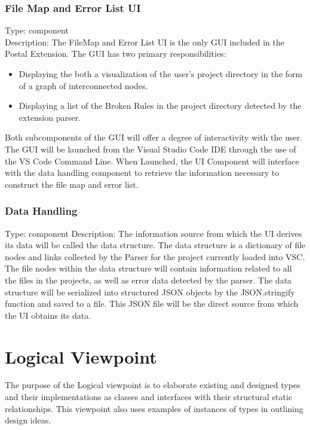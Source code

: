 \documentclass[letterpaper,10pt,titlepage,draftclsnofoot,onecolumn,onesided] {IEEEtran}
\begin{document}
		
	
	\subsubsection{File Map and Error List UI}
	Type: component
	\\
	Description: The FileMap and Error List UI is the only GUI included in the Postal Extension. 
	The GUI has two primary responsibilities: 
	\begin{itemize}
	\item Displaying the both a visualization of the user's project directory in the form of a graph of interconnected nodes.
	\item Displaying a list of the Broken Rules in the project directory detected by the extension parser.
	\end{itemize}
	Both subcomponents of the GUI will offer a degree of interactivity with the user. 
	The GUI will be launched from the Visual Studio Code IDE through the use of the VS Code Command Line.
	When Launched, the UI Component will interface with the data handling component to retrieve the information necessary to construct the file map and error list.

	
	\subsubsection{Data Handling} 
	Type: component
	Description: The information source from which the UI derives its data will be called the data structure. 
	The data structure is a dictionary of file nodes and links collected by the Parser for the project currently loaded into VSC. 
	The file nodes within the data structure will contain information related to all the files in the projects, as well as error data detected by the parser.
	The data structure will be serialized into structured JSON objects by the JSON.stringify function and saved to a file. \cite{stringify}
	This JSON file will be the direct source from which the UI obtains its data.

	
	
\section{Logical Viewpoint}
The purpose of the Logical viewpoint is to elaborate existing and designed types and their implementations
as classes and interfaces with their structural static relationships. This viewpoint also uses examples of
instances of types in outlining design ideas. 
\end{document}
